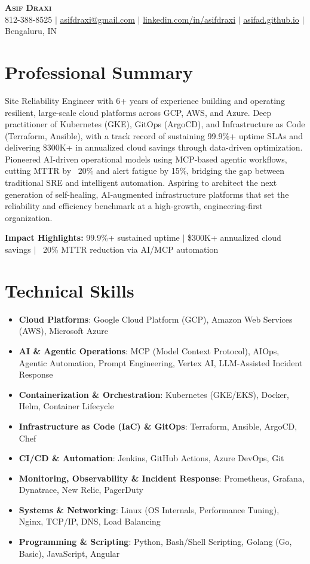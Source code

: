\documentclass[letterpaper,11pt]{article}
\newcommand{\resumeItem}[2]{
  \item\small{
    \textbf{#1}{: #2 \vspace{-2pt}}
  }
}
\newcommand{\resumeSubItem}[2]{\resumeItem{#1}{#2}\vspace{-4pt}}
\newcommand{\resumeSubHeadingListStart}{\begin{itemize}[leftmargin=*]}
\newcommand{\resumeSubHeadingListEnd}{\end{itemize}}
\begin{document}
\begin{center}
    \textbf{\Huge \scshape Asif Draxi} \\ \vspace{5pt}
    \small 812-388-8525 $|$ \href{mailto:asifdraxi@gmail.com}{\underline{asifdraxi@gmail.com}} $|$
    \href{https://www.linkedin.com/in/asifdraxi/}{\underline{linkedin.com/in/asifdraxi}} $|$
    \href{https://asifad.github.io/}{\underline{asifad.github.io}} $|$
    Bengaluru, IN
\end{center}

\section{Professional Summary}
\vspace{2pt}
\small{
Site Reliability Engineer with 6+ years of experience building and operating resilient, large-scale cloud platforms across GCP, AWS, and Azure. Deep practitioner of Kubernetes (GKE), GitOps (ArgoCD), and Infrastructure as Code (Terraform, Ansible), with a track record of sustaining 99.9\%+ uptime SLAs and delivering \$300K+ in annualized cloud savings through data-driven optimization. Pioneered AI-driven operational models using MCP-based agentic workflows, cutting MTTR by ~20\% and alert fatigue by 15\%, bridging the gap between traditional SRE and intelligent automation. Aspiring to architect the next generation of self-healing, AI-augmented infrastructure platforms that set the reliability and efficiency benchmark at a high-growth, engineering-first organization.

\vspace{3pt}
\textbf{Impact Highlights:} 99.9\%+ sustained uptime $|$ \$300K+ annualized cloud savings $|$ ~20\% MTTR reduction via AI/MCP automation
}

\section{Technical Skills}
 \resumeSubHeadingListStart
    \resumeSubItem{Cloud Platforms}{Google Cloud Platform (GCP), Amazon Web Services (AWS), Microsoft Azure}
  \resumeSubItem{AI \& Agentic Operations}{MCP (Model Context Protocol), AIOps, Agentic Automation, Prompt Engineering, Vertex AI, LLM-Assisted Incident Response}
    \resumeSubItem{Containerization \& Orchestration}{Kubernetes (GKE/EKS), Docker, Helm, Container Lifecycle}
    \resumeSubItem{Infrastructure as Code (IaC) \& GitOps}{Terraform, Ansible, ArgoCD, Chef}
    \resumeSubItem{CI/CD \& Automation}{Jenkins, GitHub Actions, Azure DevOps, Git}
    \resumeSubItem{Monitoring, Observability \& Incident Response}{Prometheus, Grafana, Dynatrace, New Relic, PagerDuty}
    \resumeSubItem{Systems \& Networking}{Linux (OS Internals, Performance Tuning), Nginx, TCP/IP, DNS, Load Balancing}
    \resumeSubItem{Programming \& Scripting}{Python, Bash/Shell Scripting, Golang (Go, Basic), JavaScript, Angular}
 \resumeSubHeadingListEnd
\end{document}
